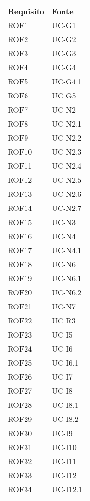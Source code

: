 \begin{longtable}{| p{5cm} | p{5cm} |}
		\rowcolor{LightBlue}
		\color{white}\bfseries Requisito & \color{white}\bfseries Fonte \\[0.25cm]
		\rowcolor{LightGray}
		ROF1 & UC-G1\\
		ROF2 & UC-G2\\
		\rowcolor{LightGray}
		ROF3 & UC-G3\\
		ROF4 & UC-G4\\		
		\rowcolor{LightGray}
		ROF5 & UC-G4.1\\
		ROF6 & UC-G5\\
		\rowcolor{LightGray}
		ROF7 & UC-N2\\
		ROF8 & UC-N2.1\\
		\rowcolor{LightGray}
		ROF9 & UC-N2.2\\
		ROF10 & UC-N2.3\\
		\rowcolor{LightGray}
		ROF11 & UC-N2.4\\
		ROF12 & UC-N2.5\\
		\rowcolor{LightGray}
		ROF13 & UC-N2.6\\
		ROF14 & UC-N2.7\\
		\rowcolor{LightGray}
		ROF15 & UC-N3\\
		ROF16 & UC-N4\\
		\rowcolor{LightGray}
		ROF17 & UC-N4.1\\
		ROF18 & UC-N6\\
		\rowcolor{LightGray}
		ROF19 & UC-N6.1\\
		ROF20 & UC-N6.2\\
		\rowcolor{LightGray}
		ROF21 & UC-N7\\
		ROF22 & UC-R3\\	
		\rowcolor{LightGray}
		ROF23 & UC-I5\\
		ROF24 & UC-I6\\
		\rowcolor{LightGray}
		ROF25 & UC-I6.1\\
		ROF26 & UC-I7\\
		\rowcolor{LightGray}
		ROF27 & UC-I8\\
		ROF28 & UC-I8.1\\
		\rowcolor{LightGray}
		ROF29 & UC-I8.2\\
		ROF30 & UC-I9\\
		\rowcolor{LightGray}
		ROF31 & UC-I10\\
		ROF32 & UC-I11\\
		\rowcolor{LightGray}
		ROF33 & UC-I12\\
		ROF34 & UC-I12.1\\

\end{longtable}
